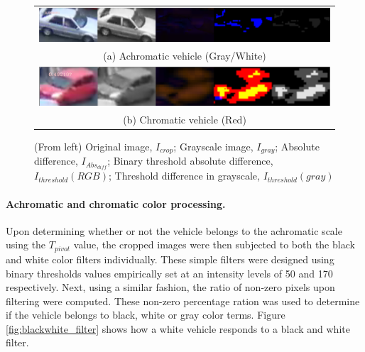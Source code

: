 \begin{figure}[htb!]
  \centering
\begin{tabular}{c}
 \includegraphics[width=0.9\linewidth]{image/general/achromatic_threshold5.PNG} \\  
 (a) Achromatic vehicle (Gray/White) \\
 \includegraphics[width=0.9\linewidth]{image/general/achromatic_threshold_color2.PNG}\\
(b) Chromatic vehicle (Red)
\end{tabular}
\caption{(From left) Original image, $I_{crop}$; Grayscale image, $I_{gray}$; Absolute difference, $I_{Abs_{diff}}$; Binary threshold absolute difference, $I_{threshold}(RGB)$; Threshold difference in grayscale, $I_{threshold}(gray)$} \label{fig:achromatic_thresh}
\end{figure}



\paragraph{Achromatic and chromatic color processing.} Upon determining whether or not the vehicle belongs to the achromatic scale using the $T_{pivot}$ value, the cropped images were then subjected to both the black and white color filters individually. These simple filters were designed using binary thresholds values empirically set at an intensity levels of 50 and 170 respectively. Next, using a similar fashion, the ratio of non-zero pixels upon filtering were computed. These non-zero percentage ration was used to determine if the vehicle belongs to black, white or gray color terms. Figure \ref{fig:blackwhite_filter} shows how a white vehicle responds to a black and white filter. 


